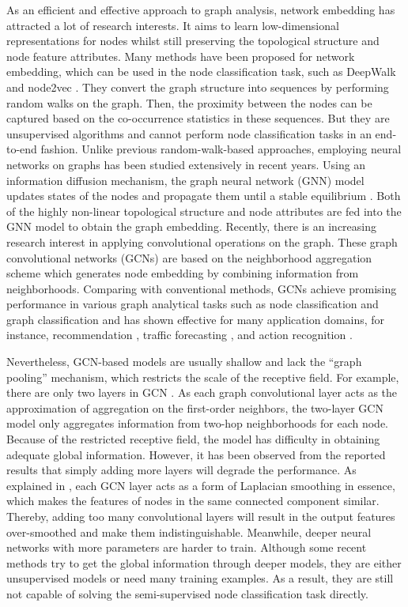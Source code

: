 \documentclass{article}
\begin{document}
As an efficient and effective approach to graph analysis, network embedding has attracted a lot of research interests. It aims to learn low-dimensional representations for nodes whilst still preserving the topological structure and node feature attributes. Many methods have been proposed for network embedding, which can be used in the node classification task, such as DeepWalk \cite{Perozzi:2014:DOL:2623330.2623732} and node2vec \cite{Grover:2016:NSF:2939672.2939754}. They convert the graph structure into sequences by performing random walks on the graph. Then, the proximity between the nodes can be captured based on the co-occurrence statistics in these sequences. But they are unsupervised algorithms and cannot perform node classification tasks in an end-to-end fashion. Unlike previous random-walk-based approaches, employing neural networks on graphs has been studied extensively in recent years. Using an information diffusion mechanism, the graph neural network (GNN) model updates states of the nodes and propagate them until a stable equilibrium \cite{Scarselli:2009ku}. Both of the highly non-linear topological structure and node attributes are fed into the GNN model to obtain the graph embedding. Recently, there is an increasing research interest in applying convolutional operations on the graph. These graph convolutional networks (GCNs) \cite{Kipf:2016tc,Velickovic:2018we} are based on the neighborhood aggregation scheme which generates node embedding by combining information from neighborhoods. Comparing with conventional methods, GCNs achieve promising performance in various graph analytical tasks such as node classification and graph classification \cite{NIPS2016_6081} and has shown effective for many application domains, for instance, recommendation \cite{Wu:2019vb,Cui:2019:DWO:3308558.3313444}, traffic forecasting \cite{Yu:2018fqba}, and action recognition \cite{stgcn_aaai18}.

Nevertheless, GCN-based models are usually shallow and lack the ``graph pooling'' mechanism, which restricts the scale of the receptive field. For example, there are only two layers in GCN \cite{Kipf:2016tc}. As each graph convolutional layer acts as the approximation of aggregation on the first-order neighbors, the two-layer GCN model only aggregates information from two-hop neighborhoods for each node. Because of the restricted receptive field, the model has difficulty in obtaining adequate global information. However, it has been observed from the reported results \cite{Kipf:2016tc} that simply adding more layers will degrade the performance. As explained in \cite{AAAI1816098}, each GCN layer acts as a form of Laplacian smoothing in essence, which makes the features of nodes in the same connected component similar. Thereby, adding too many convolutional layers will result in the output features over-smoothed and make them indistinguishable. Meanwhile, deeper neural networks with more parameters are harder to train. Although some recent methods \cite{AAAI1816273,pmlr-v80-xu18c,Ying2018HierarchicalGR} try to get the global information through deeper models, they are either unsupervised models or need many training examples. As a result, they are still not capable of solving the semi-supervised node classification task directly.
\end{document}
